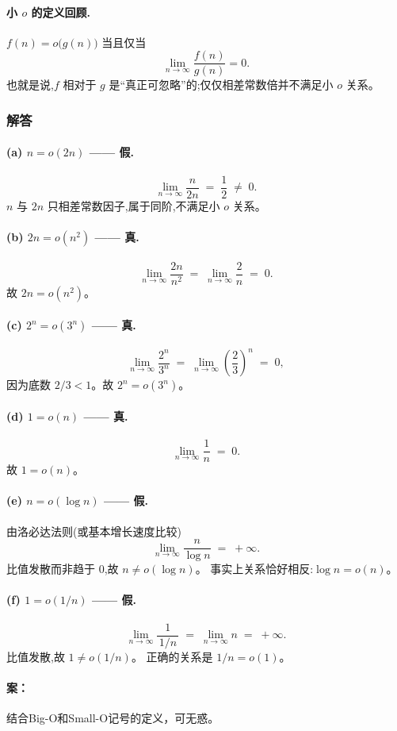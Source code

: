 \begin{answerred}
\paragraph{小 $o$ 的定义回顾.}
$f(n) = o\bigl(g(n)\bigr)$ 当且仅当
\[
    \lim_{n \to \infty} \frac{f(n)}{g(n)} = 0.
\]
也就是说,$f$ 相对于 $g$ 是“真正可忽略”的;仅仅相差常数倍并不满足小 $o$ 关系。
 
\subsubsection*{解答}
 
\paragraph{(a) $n = o(2n)$ —— \textbf{假}.}
\[
    \lim_{n \to \infty} \frac{n}{2n} \;=\; \frac{1}{2} \;\neq\; 0.
\]
$n$ 与 $2n$ 只相差常数因子,属于同阶,不满足小 $o$ 关系。
 
\paragraph{(b) $2n = o(n^2)$ —— \textbf{真}.}
\[
    \lim_{n \to \infty} \frac{2n}{n^2} \;=\; \lim_{n \to \infty} \frac{2}{n} \;=\; 0.
\]
故 $2n = o(n^2)$。
 
\paragraph{(c) $2^n = o(3^n)$ —— \textbf{真}.}
\[
    \lim_{n \to \infty} \frac{2^n}{3^n}
    \;=\; \lim_{n \to \infty} \left(\frac{2}{3}\right)^n
    \;=\; 0,
\]
因为底数 $2/3 < 1$。故 $2^n = o(3^n)$。
 
\paragraph{(d) $1 = o(n)$ —— \textbf{真}.}
\[
    \lim_{n \to \infty} \frac{1}{n} \;=\; 0.
\]
故 $1 = o(n)$。
 
\paragraph{(e) $n = o(\log n)$ —— \textbf{假}.}
由洛必达法则(或基本增长速度比较)
\[
    \lim_{n \to \infty} \frac{n}{\log n} \;=\; +\infty.
\]
比值发散而非趋于 $0$,故 $n \neq o(\log n)$。
事实上关系恰好相反:$\log n = o(n)$。
 
\paragraph{(f) $1 = o(1/n)$ —— \textbf{假}.}
\[
    \lim_{n \to \infty} \frac{1}{\,1/n\,} \;=\; \lim_{n \to \infty} n \;=\; +\infty.
\]
比值发散,故 $1 \neq o(1/n)$。
正确的关系是 $1/n = o(1)$。
 
\begin{answernote}
\paragraph{案：} 结合Big-O和Small-O记号的定义，可无惑。

\end{answernote}
\end{answerred}
